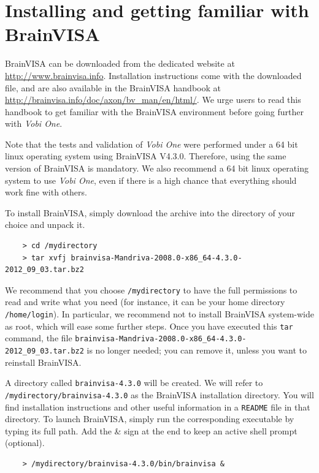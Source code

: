 \section{Installing and getting familiar with BrainVISA}

BrainVISA can be downloaded from the dedicated website at \url{http://www.brainvisa.info}. Installation instructions come with the downloaded file, and are also available in the BrainVISA handbook at \url{http://brainvisa.info/doc/axon/bv_man/en/html/}. We urge users to read this handbook to get familiar with the BrainVISA environment before going further with {\em Vobi One}.

Note that the tests and validation of {\em Vobi One} were performed under a 64 bit linux operating system using BrainVISA V4.3.0. Therefore, using the same version of BrainVISA is mandatory. We also recommend a 64 bit linux operating system to use {\em Vobi One}, even if there is a high chance that everything should work fine with others.

To install BrainVISA, simply download the archive into the directory of your choice and unpack it.

\begin{verbatim}
    > cd /mydirectory
    > tar xvfj brainvisa-Mandriva-2008.0-x86_64-4.3.0-2012_09_03.tar.bz2
\end{verbatim}

We recommend that you choose \texttt{/mydirectory} to have the full permissions to read and write what you need (for instance, it can be your home directory \texttt{/home/login}). In particular, we recommend not to install BrainVISA system-wide as root, which will ease some further steps. Once you have executed this \texttt{tar} command, the file \texttt{brainvisa-Mandriva-2008.0-x86\_64-4.3.0-2012\_09\_03.tar.bz2} is no longer needed; you can remove it, unless you want to reinstall BrainVISA.

A directory called \texttt{brainvisa-4.3.0} will be created. We will refer to \texttt{/mydirectory/brainvisa-4.3.0} as the BrainVISA installation directory. You will find installation instructions and other useful information in a \texttt{README} file in that directory. To launch BrainVISA, simply run the corresponding executable by typing its full path. Add the \& sign at the end to keep an active shell prompt (optional).

\begin{verbatim}
    > /mydirectory/brainvisa-4.3.0/bin/brainvisa &
\end{verbatim}

